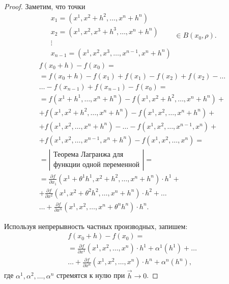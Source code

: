\begin{proof}
    Заметим, что точки
    \[
        \begin{array}{l}
            x_1 = (x^1,x^2+h^2,\ldots,x^n+h^n)       \\
            x_2 = (x^1,x^2,x^3 + h^3,\ldots,x^n+h^n) \\
            \vdots                                   \\
            x_{n-1} = (x^1,x^2,x^3,\ldots,x^{n-1},x^n+h^n)
        \end{array} \in B(x_0,\rho).
    \]
    \begin{multline*}
        f(x_0 + h) - f(x_0) = \\
        = f(x_0 + h) - f(x_1) + f(x_1) - f(x_2) + f(x_2) - \ldots\\
        \ldots - f(x_{n-1}) + f(x_{n-1}) - f(x_0) = \\
        = f(x^1 + h^1, \ldots,  x^n + h^n) - f(x^1, x^2 + h^2,  \ldots,  x^n + h^n) + \\
        + f(x^1,  x^2 + h^2,  \ldots,  x^n + h^n) - f(x^1,  x^2,  \ldots,  x^n + h^n) + \\
        + f(x^1,  x^2,  \ldots,  x^n + h^n) - \ldots - f(x^1,  x^2,  \ldots,  x^{n-1},  x^n) + \\
        + f(x^1,  x^2,  \ldots,  x^{n-1},  x^n + h^n) - f(x^1,  x^2,  \ldots,  x^n) = \\
        = \left|\begin{array}{c}
            \text{Теорема Лагранжа для} \\
            \text{функции одной переменной}
        \end{array}\right| = \\
        = \frac{\partial f}{\partial x_1}(x^1 + \theta^1 h^1,  x^2 + h^2,  \ldots,  x^n + h^n) \cdot h^1 + \\
        + \frac{\partial f}{\partial x^2}(x^1,  x^2 + \theta^2 h^2,  \ldots,  x^n + h^n) \cdot h^2 + \ldots \\
        \ldots + \frac{\partial f}{\partial x^n}(x^1,  x^2,  \ldots,  x^n + \theta^n h^n) \cdot h^n.
    \end{multline*}

    Используя непрерывность частных производных, запишем:
    \begin{multline*}
        f(x_0 + h) - f(x_0) = \\
        = \frac{\partial f}{\partial x^1}(x^1, x^2, \ldots, x^n) \cdot h^1 + \alpha^1(h^1) + \ldots \\
        \ldots + \frac{\partial f}{\partial x^n}(x^1, x^2, \ldots, x^n) \cdot h^n + \alpha^n(h^n),
    \end{multline*}
    где $\alpha^1,\alpha^2,\ldots,\alpha^n$ стремятся к нулю при $\vec{h}\rightarrow0$.


\end{proof}
